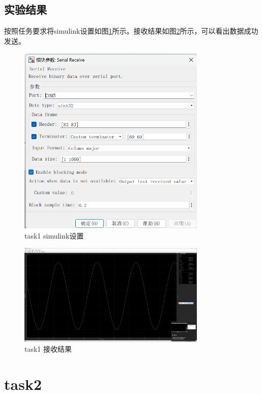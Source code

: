 \documentclass[UTF8]{ctexart}
\begin{document}
\subsection{实验结果}
按照任务要求将simulink设置如图\ref{fig:task1_simulink}所示。接收结果如图\ref{fig:task1_result}所示，可以看出数据成功发送。
\begin{figure}[!ht]
    \centering
    \includegraphics[width=0.8\textwidth]{task1_simulink.png}
    \caption{task1 simulink设置}
    \label{fig:task1_simulink}
\end{figure}

\begin{figure}[!ht]
    \centering
    \includegraphics[width=0.8\textwidth]{task1_result.png}
    \caption{task1 接收结果}
    \label{fig:task1_result}
\end{figure}
\FloatBarrier
\section{task2}
\end{document}
